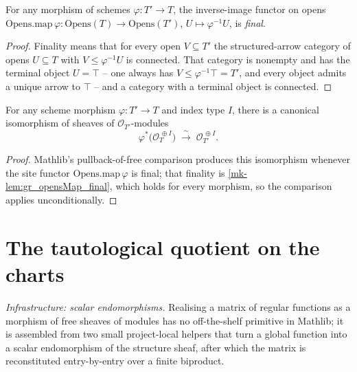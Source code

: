 \begin{lemma}\label{mk-lem:gr_opensMap_final}
  \leanok

  For any morphism of schemes \(\varphi : T' \to T\), the inverse-image functor on opens
  \(\mathrm{Opens.map}\,\varphi : \mathrm{Opens}(T) \to \mathrm{Opens}(T')\),
  \(U \mapsto \varphi^{-1}U\), is \emph{final}.
\end{lemma}

\begin{proof}
  \leanok


Finality means that for every open \(V \subseteq T'\) the structured-arrow category of
  opens \(U \subseteq T\) with \(V \le \varphi^{-1}U\) is connected. That category is
  nonempty and has the terminal object \(U = \top\) -- one always has
  \(V \le \varphi^{-1}\top = T'\), and every object admits a unique arrow to \(\top\) --
  and a category with a terminal object is connected.
\end{proof}

\begin{lemma}\label{mk-lem:gr_pullbackFreeIso}
  \leanok

  For any scheme morphism \(\varphi : T' \to T\) and index type \(I\), there is a canonical
  isomorphism of sheaves of \(\mathcal{O}_{T'}\)-modules
  \[
    \varphi^{*}\bigl(\mathcal{O}_T^{\,\oplus I}\bigr)
      \;\xrightarrow{\ \sim\ }\;
    \mathcal{O}_{T'}^{\,\oplus I}.
  \]
\end{lemma}

\begin{proof}
  \leanok
  Mathlib's pullback-of-free comparison produces this isomorphism whenever the site functor
  \(\mathrm{Opens.map}\,\varphi\) is final; that finality is \ref{mk-lem:gr_opensMap_final},
  which holds for every morphism, so the comparison applies unconditionally.
\end{proof}


\section{The tautological quotient on the charts}
\label{mk-sec:grquot_chart}

\emph{Infrastructure: scalar endomorphisms.} Realising a matrix of regular
functions as a morphism of free sheaves of modules has no off-the-shelf primitive
in Mathlib; it is assembled from two small project-local helpers that turn a global
function into a scalar endomorphism of the structure sheaf, after which the matrix
is reconstituted entry-by-entry over a finite biproduct.

